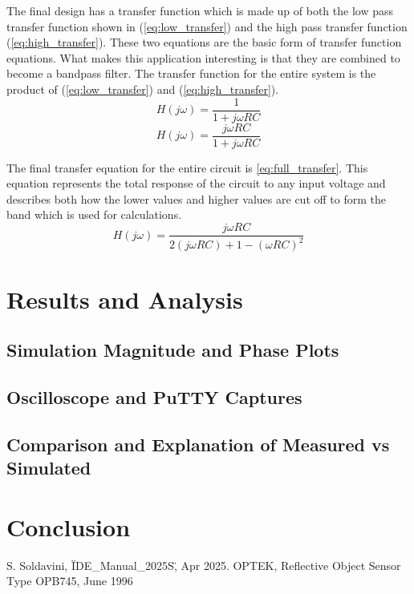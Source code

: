 \documentclass[conference]{IEEEtran}
\begin{document}
    The final design has a transfer function which is made up of both the low
    pass transfer function shown in (\ref{eq:low_transfer}) and the high pass
    transfer function (\ref{eq:high_transfer}). These two equations are the basic
    form of transfer function equations. What makes this application
    interesting is that they are combined to become a bandpass filter.
    The transfer function for the entire system is the product of
    (\ref{eq:low_transfer}) and (\ref{eq:high_transfer}). \\
    \begin{equation}
        H(j\omega) = \frac{1}{1+j\omega RC}
        \label{eq:low_transfer}
    \end{equation}
    \begin{equation}
        H(j\omega) = \frac{j\omega RC}{1+j\omega RC}
        \label{eq:high_transfer}
    \end{equation}

    The final transfer equation for the entire circuit is
    \ref{eq:full_transfer}. This equation represents the total response of the
    circuit to any input voltage and describes both how the lower values and
    higher values are cut off to form the band which is used for calculations.
    \begin{equation}
        H(j\omega) = \frac{j\omega RC}{2(j\omega RC) + 1 - (\omega RC)^2}
        \label{eq:full_transfer}
    \end{equation}

\section{Results and Analysis}
    \subsection{Simulation Magnitude and Phase Plots}
    \subsection{Oscilloscope and PuTTY Captures}
    \subsection{Comparison and Explanation of Measured vs Simulated}

\section{Conclusion}

\begin{thebibliography}{00}
     S. Soldavini, \"IDE\_Manual\_2025S\", Apr 2025.
     OPTEK, Reflective Object Sensor Type OPB745, June 1996
    \end{thebibliography}
\end{document}
